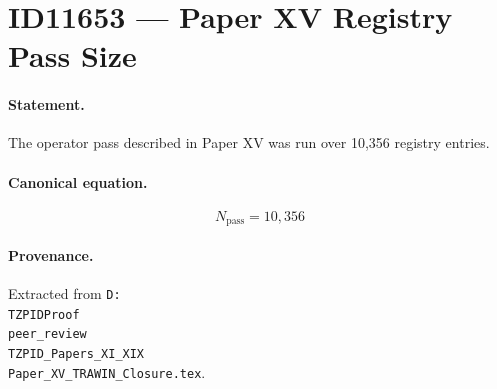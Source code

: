 \section*{ID11653 --- Paper XV Registry Pass Size}

\paragraph{Statement.}
The operator pass described in Paper XV was run over 10,356 registry entries.

\paragraph{Canonical equation.}
\[
N_{\mathrm{pass}}=10{,}356
\]

\paragraph{Provenance.}
Extracted from \texttt{D:\\TZPIDProof\\peer\_review\\TZPID\_Papers\_XI\_XIX\\Paper\_XV\_TRAWIN\_Closure.tex}.
